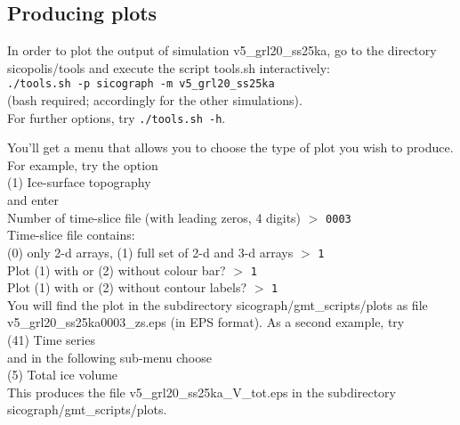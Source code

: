 \documentclass[12pt,a4paper]{article}
\begin{document}
\subsection{Producing plots}

In order to plot the output of simulation v5\_grl20\_ss25ka, go to the directory sicopolis/tools and execute the script tools.sh interactively:
\\
\hspace*{10mm}\verb+./tools.sh -p sicograph -m v5_grl20_ss25ka+
\\
(bash required; accordingly for the other simulations).
\\
For further options, try \verb+./tools.sh -h+.

\par\vspace*{1ex}\par

\noindent{}You'll get a menu that allows you to choose the type of plot you wish to produce. For example, try the option
\\
\hspace*{10mm}(1) Ice-surface topography
\\
and enter
\\
\hspace*{10mm}Number of time-slice file (with leading zeros, 4 digits) $>$ \verb+0003+
\\
\hspace*{10mm}Time-slice file contains:\\
\hspace*{14mm} (0) only 2-d arrays, (1) full set of 2-d and 3-d arrays $>$ \verb+1+
\\
\hspace*{10mm}Plot (1) with or (2) without colour bar? $>$ \verb+1+
\\
\hspace*{10mm}Plot (1) with or (2) without contour labels? $>$ \verb+1+
\\
You will find the plot in the subdirectory sicograph/gmt\_scripts/plots as file \linebreak{}v5\_grl20\_ss25ka0003\_zs.eps (in EPS format). As a second example, try
\\
\hspace*{10mm}(41) Time series
\\
and in the following sub-menu choose
\\
\hspace*{10mm}(5) Total ice volume
\\
This produces the file v5\_grl20\_ss25ka\_V\_tot.eps in the subdirectory
\linebreak
sicograph/gmt\_scripts/plots.
\end{document}
